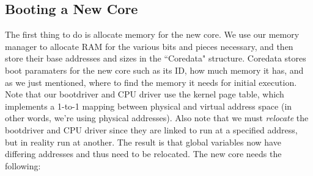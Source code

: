 \subsection{Booting a New Core}
The first thing to do is allocate memory for the new core. We use our memory manager to allocate RAM for the various bits and pieces necessary, and then store their base addresses and sizes in the ``Coredata" structure. Coredata stores boot paramaters for the new core such as its ID, how much memory it has, and as we just mentioned, where to find the memory it needs for initial execution. Note that our bootdriver and CPU driver use the kernel page table, which implements a 1-to-1 mapping between physical and virtual address space (in other words, we're using physical addresses). Also note that we must \textit{relocate} the bootdriver and CPU driver since they are linked to run at a specified address, but in reality run at another. The result is that global variables now have differing addresses and thus need to be relocated. The new core needs the following:
